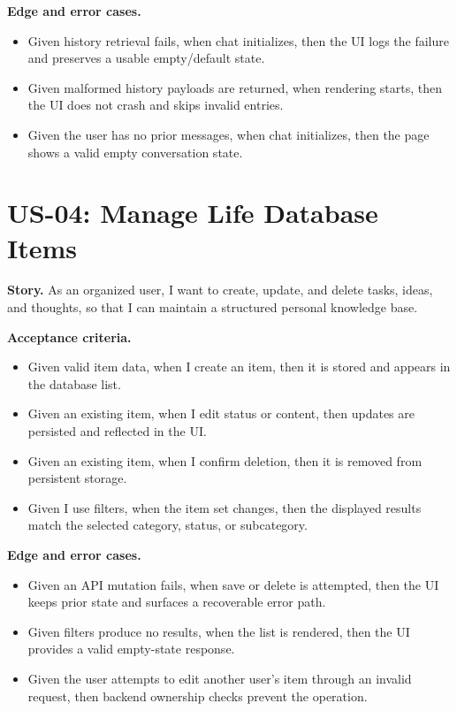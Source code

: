 \textbf{Edge and error cases.}
\begin{itemize}
  \item Given history retrieval fails, when chat initializes, then the UI logs the failure and preserves a usable empty/default state.
  \item Given malformed history payloads are returned, when rendering starts, then the UI does not crash and skips invalid entries.
  \item Given the user has no prior messages, when chat initializes, then the page shows a valid empty conversation state.
\end{itemize}

\section{US-04: Manage Life Database Items}

\textbf{Story.} As an organized user, I want to create, update, and delete tasks, ideas, and thoughts, so that I can maintain a structured personal knowledge base.

\textbf{Acceptance criteria.}
\begin{itemize}
  \item Given valid item data, when I create an item, then it is stored and appears in the database list.
  \item Given an existing item, when I edit status or content, then updates are persisted and reflected in the UI.
  \item Given an existing item, when I confirm deletion, then it is removed from persistent storage.
  \item Given I use filters, when the item set changes, then the displayed results match the selected category, status, or subcategory.
\end{itemize}

\textbf{Edge and error cases.}
\begin{itemize}
  \item Given an API mutation fails, when save or delete is attempted, then the UI keeps prior state and surfaces a recoverable error path.
  \item Given filters produce no results, when the list is rendered, then the UI provides a valid empty-state response.
  \item Given the user attempts to edit another user's item through an invalid request, then backend ownership checks prevent the operation.
\end{itemize}

